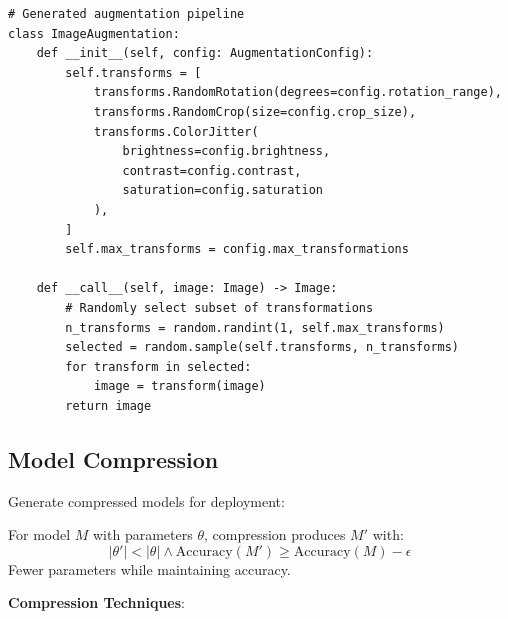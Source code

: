 \begin{verbatim}
# Generated augmentation pipeline
class ImageAugmentation:
    def __init__(self, config: AugmentationConfig):
        self.transforms = [
            transforms.RandomRotation(degrees=config.rotation_range),
            transforms.RandomCrop(size=config.crop_size),
            transforms.ColorJitter(
                brightness=config.brightness,
                contrast=config.contrast,
                saturation=config.saturation
            ),
        ]
        self.max_transforms = config.max_transformations

    def __call__(self, image: Image) -> Image:
        # Randomly select subset of transformations
        n_transforms = random.randint(1, self.max_transforms)
        selected = random.sample(self.transforms, n_transforms)
        for transform in selected:
            image = transform(image)
        return image
\end{verbatim}

\subsection{Model Compression}

Generate compressed models for deployment:

\begin{definition}
    For model $M$ with parameters $\theta$, compression produces $M'$ with:
    \begin{equation}
        |\theta'| < |\theta| \land \text{Accuracy}(M') \geq \text{Accuracy}(M) - \epsilon
    \end{equation}
    Fewer parameters while maintaining accuracy.
\end{definition}

\textbf{Compression Techniques}:

